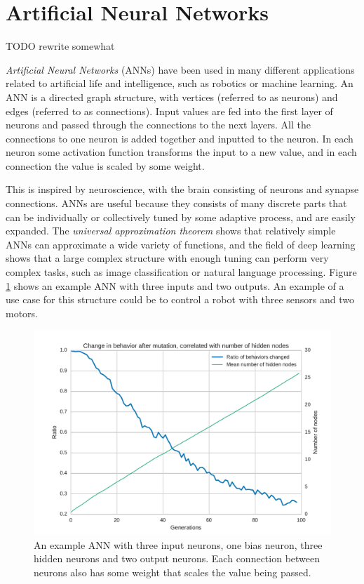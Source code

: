 \section{Artificial Neural Networks}
TODO rewrite somewhat

\textit{Artificial Neural Networks} (ANNs) \cite[Chapter 1]{bengio2015deep} have been used in many different applications related to artificial life and intelligence, such as robotics or machine learning.
An ANN is a directed graph structure, with vertices (referred to as neurons) and edges (referred to as connections).
Input values are fed into the first layer of neurons and passed through the connections to the next layers.
All the connections to one neuron is added together and inputted to the neuron.
In each neuron some activation function transforms the input to a new value, and in each connection the value is scaled by some weight.

This is inspired by neuroscience, with the brain consisting of neurons and synapse connections.
ANNs are useful because they consists of many discrete parts that can be individually or collectively tuned by some adaptive process,
and are easily expanded.
The \textit{universal approximation theorem} \cite{Hornik1989359} shows that relatively simple ANNs can approximate a wide variety of functions,
and the field of deep learning shows that a large complex structure with enough tuning can perform very complex tasks, such as image classification or natural language processing.
Figure \ref{fig:ann} shows an example ANN with three inputs and two outputs.
An example of a use case for this structure could be to control a robot with three sensors and two motors.

\begin{figure}
\centering
\includegraphics[width=.5\columnwidth]{fig/Artificial_neural_network}
\caption[Example ANN]{
    An example ANN with three input neurons, one bias neuron, three hidden neurons and two output neurons.
    Each connection between neurons also has some weight that scales the value being passed.
}
\label{fig:ann}
\end{figure}

